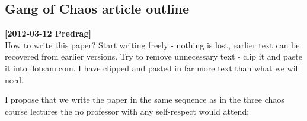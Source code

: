 \subsection{Gang of Chaos article outline}
\label{chap:outline}

\noindent
{\bf [2012-03-12 Predrag]}
\\
How to write this paper? Start writing freely - nothing is lost, earlier text can be recovered
from earlier versions. Try to remove unnecessary text - clip  it and paste it into flotsam.com.
I have clipped and pasted in far more text than what we will need.

I propose that we write the
paper in the same sequence as in the three chaos course lectures
the no professor with any self-respect would attend:

